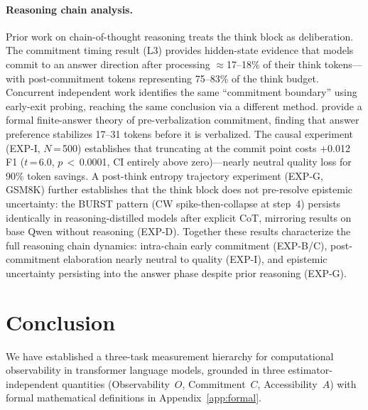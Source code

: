 \documentclass[11pt]{article}
\begin{document}
\paragraph{Reasoning chain analysis.}
Prior work on chain-of-thought reasoning \citep{wei2022chain,kojima2022zeroshot} treats
the think block as deliberation. The commitment timing result (L3) provides
hidden-state evidence that models commit to an answer direction after processing
$\approx$17--18\% of their think tokens---with post-commitment tokens representing 75--83\%
of the think budget. Concurrent independent work \citep{scalena2026commitment} identifies
the same ``commitment boundary'' using early-exit probing, reaching the same conclusion
via a different method. \citet{zhang2026commit} provide a formal finite-answer theory of
pre-verbalization commitment, finding that answer preference stabilizes 17--31 tokens
before it is verbalized. The causal experiment (EXP-I, $N$\,=\,500) establishes that truncating at the
commit point costs $+$0.012 F1 ($t$\,=\,6.0, $p$\,$<$\,0.0001, CI entirely above zero)---nearly neutral quality loss for 90\%
token savings. A post-think entropy trajectory experiment (EXP-G, GSM8K) further
establishes that the think block does not pre-resolve epistemic uncertainty: the BURST
pattern (CW spike-then-collapse at step~4) persists identically in reasoning-distilled
models after explicit CoT, mirroring results on base Qwen without reasoning (EXP-D).
Together these results characterize the full reasoning chain dynamics: intra-chain early
commitment (EXP-B/C), post-commitment elaboration nearly neutral to quality (EXP-I), and
epistemic uncertainty persisting into the answer phase despite prior reasoning (EXP-G).

\section{Conclusion}
\label{sec:conclusion}

We have established a three-task measurement hierarchy for computational observability
in transformer language models, grounded in three estimator-independent quantities
(Observability~$O$, Commitment~$C$, Accessibility~$A$) with formal mathematical
definitions in Appendix~\ref{app:formal}.
\end{document}
